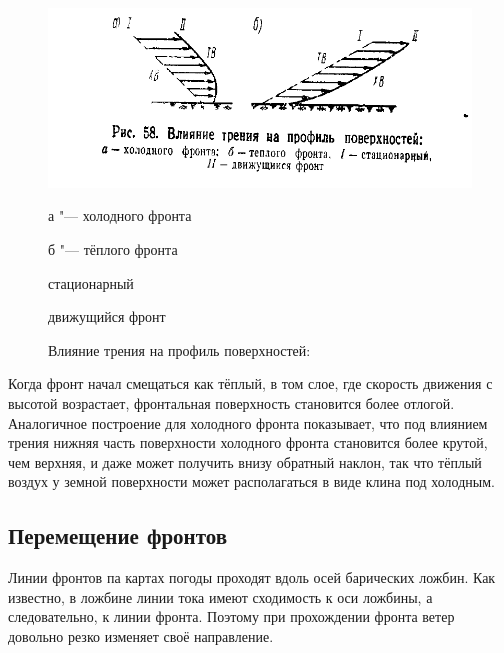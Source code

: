 \documentclass[a4paper, 12pt, twoside, final, book, russian, fittopage, cyremdash, openright]{ncc}
\begin{document}
\begin{figure}[htb]
   \centering
   \includegraphics[scale=1]{12_friction_surface_profile.pdf}
   \caption[Влияние трения на профиль поверхностей]{Влияние трения на профиль поверхностей:}
   \label{fig:firction_sufrace_profile}
   \small
   \begin{enumerate*}[itemjoin={{; }}, label={}, after={{; }}]
   \item а "--- холодного фронта
   \item б "--- тёплого фронта
   \end{enumerate*}
   \begin{enumerate*}[itemjoin={{; }}, label={\Roman* "--- }]
   \item стационарный
   \item движущийся фронт
   \end{enumerate*}
\end{figure}

Когда фронт начал смещаться как тёплый, в том слое, где скорость
движения с высотой возрастает, фронтальная поверхность становится
более отлогой. Аналогичное построение для холодного фронта показывает,
что под влиянием трения нижняя часть поверхности холодного фронта
становится более крутой, чем верхняя, и даже может получить внизу
обратный наклон, так что тёплый воздух у земной поверхности может
располагаться в виде клина под холодным.

\subsection{Перемещение фронтов}
\label{sec:fronts_moving}

Линии фронтов па картах погоды проходят вдоль осей барических
ложбин. Как известно, в ложбине линии тока имеют сходимость к оси
ложбины, а следовательно, к линии фронта. Поэтому при прохождении
фронта ветер довольно резко изменяет своё направление.
\end{document}

